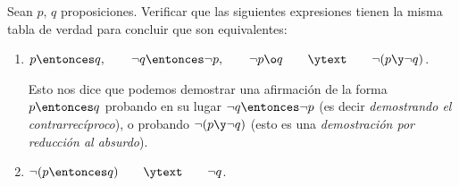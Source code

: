 \begin{enunciado}{\ejercicio}
  Sean $p,\, q$ proposiciones. Verificar que las siguientes expresiones tienen la misma tabla de verdad para
  concluir que son equivalentes:

  \begin{enumerate}[label=\roman*)]
    \item\label{10-1-i} $p \entonces q,
            \qquad
            \neg q \entonces \neg p, \qquad \neg p \o q \qquad \ytext \qquad  \neg (p \y \neg q)$.\par
          Esto nos dice que podemos demostrar una afirmación de la forma $p \entonces q$ probando en su lugar
          $\neg q \entonces \neg p$ (es decir \textit{demostrando el contrarrecíproco}), o probando $\neg (p \y \neg q)$ (esto
          es una \textit{demostración por reducción al absurdo}).

    \item $\neg(p \entonces q)\qquad \ytext \qquad \neg q$.
  \end{enumerate}
\end{enunciado}

